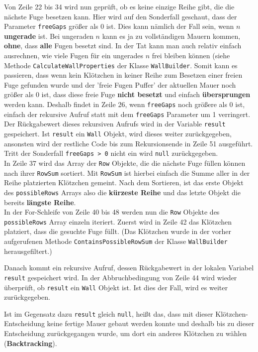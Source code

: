 \documentclass[a4paper,12pt]{article}
\newcommand{\code}{\texttt}
\begin{document}
Von Zeile 22 bis 34 wird nun geprüft, ob es keine einzige Reihe gibt, die die nächste Fuge besetzen kann. Hier wird auf den Sonderfall geschaut, dass der Parameter \code{freeGaps} größer als 0 ist. Dies kann nämlich der Fall sein, wenn $n$ \textbf{ungerade} ist. Bei ungeraden $n$ kann es ja zu vollständigen Mauern kommen, \textbf{ohne}, dass \textbf{alle} Fugen besetzt sind. In der Tat kann man auch relativ einfach ausrechnen, wie viele Fugen für ein ungerades $n$ frei bleiben können (siehe Methode \code{CalculateWallProperties} der Klasse \code{WallBuilder}. Somit kann es passieren, dass wenn kein Klötzchen in keiner Reihe zum Besetzen einer freien Fuge gefunden wurde und der 'freie Fugen Puffer' der aktuellen Mauer noch größer als 0 ist, dass diese freie Fuge \textbf{nicht besetzt} und einfach \textbf{übersprungen} werden kann.
Deshalb findet in Zeile 26, wenn \code{freeGaps} noch größere als 0 ist, einfach der rekursive Aufruf statt mit dem \code{freeGaps} Parameter um 1 verringert. Der Rückgabewert dieses rekursiven Aufrufs wird in der Variable \code{result} gespeichert. Ist \code{result} ein \code{Wall} Objekt, wird dieses weiter zurückgegeben, ansonsten wird der restliche Code bis zum Rekursionsende in Zeile 51 ausgeführt.
Tritt der Sonderfall \code{freeGaps > 0} nicht ein wird \code{null} zurückgegeben.
\\[0.4cm]
In Zeile 37 wird das Array der \code{Row} Objekte, die die nächste Fuge füllen können nach ihrer \code{RowSum} sortiert. Mit \code{RowSum} ist hierbei einfach die Summe aller in der Reihe platzierten Klötzchen gemeint.
Nach dem Sortieren, ist das erste Objekt des \code{possibleRows} Arrays also die \textbf{kürzeste Reihe} und das letzte Objekt die bereits \textbf{längste Reihe}.
\\[0.4cm]
In der For-Schleife von Zeile 40 bis 48 werden nun die \code{Row} Objekte des \code{possibleRows} Array einzeln iteriert.
Zuerst wird in Zeile 42 das Klötzchen platziert, dass die gesuchte Fuge füllt. (Das Klötzchen wurde in der vorher aufgerufenen Methode \code{ContainsPossibleRowSum} der Klasse \code{WallBuilder} herausgefiltert.)

Danach kommt ein rekursive Aufruf, dessen Rückgabewert in der lokalen Variabel \code{result} gespeichert wird. In der Abbruchbedingung von Zeile 44 wird wieder überprüft, ob \code{result} ein \code{Wall} Objekt ist. Ist dies der Fall, wird es weiter zurückgegeben.

Ist im Gegensatz dazu \code{result} gleich \code{null}, heißt das, dass mit dieser Klötzchen-Entscheidung keine fertige Mauer gebaut werden konnte und deshalb bis zu dieser Entscheidung zurückgegangen wurde, um dort ein anderes Klötzchen zu wählen (\textbf{Backtracking}).
\end{document}
